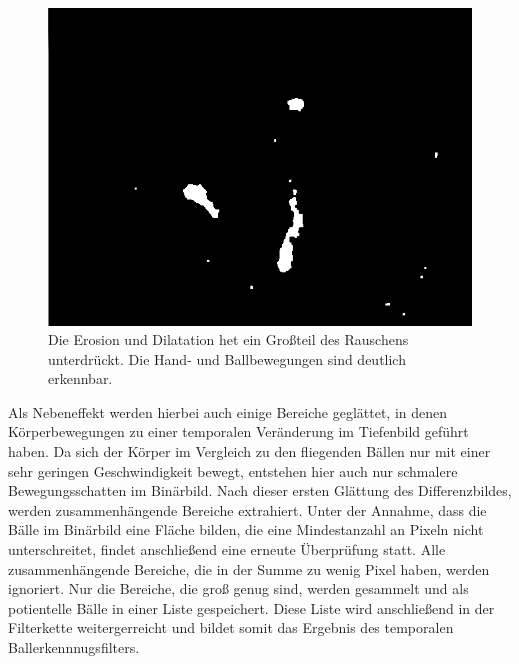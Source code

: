 \documentclass[12pt,a4paper,ngerman]{scrartcl}
\begin{document}
\begin{figure}[H]
    \centering
    \includegraphics[scale=0.7]{img/rauschfrei.png}
    \caption{Die Erosion und Dilatation het ein Großteil des Rauschens unterdrückt. Die Hand- und Ballbewegungen sind deutlich erkennbar.}
    \label{temporal_rauschfrei}
\end{figure}

Als Nebeneffekt werden hierbei auch einige Bereiche geglättet, in denen Körperbewegungen zu einer temporalen Veränderung im Tiefenbild geführt haben. Da sich der Körper im Vergleich zu den fliegenden Bällen nur mit einer sehr geringen Geschwindigkeit bewegt, entstehen hier auch nur schmalere Bewegungsschatten im Binärbild.
Nach dieser ersten Glättung des Differenzbildes, werden zusammenhängende Bereiche extrahiert.
Unter der Annahme, dass die Bälle im Binärbild eine Fläche bilden, die eine Mindestanzahl an Pixeln nicht unterschreitet, findet anschließend eine erneute Überprüfung statt. Alle zusammenhängende Bereiche, die in der Summe zu wenig Pixel haben, werden ignoriert.
Nur die Bereiche, die groß genug sind, werden gesammelt und als potientelle Bälle in einer Liste gespeichert.
Diese Liste wird anschließend in der Filterkette weitergerreicht und bildet somit das Ergebnis des temporalen Ballerkennnugsfilters.
\end{document}
